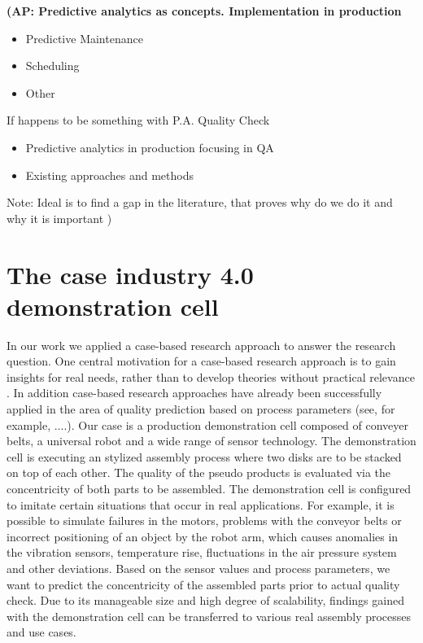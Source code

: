 \documentclass[5p,times,procedia]{elsarticle}
\newcommand{\AP}[1]{{\color{blue} {\bf (AP: #1)}}}
\begin{document}
\AP{
Predictive analytics as concepts. Implementation in production
\begin{itemize}
       \item Predictive Maintenance
       \item Scheduling
       \item Other
\end{itemize}       
If happens to be something with P.A. Quality Check
\begin{itemize}
       \item	Predictive analytics in production focusing in QA
       \item	Existing approaches and methods
\end{itemize}      
Note: Ideal is to find a gap in the literature, that proves why do we do it and why it is important
}


\section{The case industry 4.0 demonstration cell} %

In our work we applied a case-based research approach \cite{yin2017case} to answer the research question. 
One central motivation for a case-based research approach is to gain insights for real needs, rather than to develop theories without practical relevance \cite{cutcheon1993case}. %
In addition case-based research approaches have already been successfully applied in the area of quality prediction based on process parameters (see, for example, ....). %
Our case is a production demonstration cell composed of conveyer belts, a universal robot and a wide range of sensor technology.
The demonstration cell is executing an stylized assembly process where two disks are to be stacked on top of each other. 
The quality of the pseudo products is evaluated via the concentricity of both parts to be assembled. The demonstration cell is configured to imitate certain situations that occur in real applications.
For example, it is possible to simulate failures in the motors, problems with the conveyor belts or incorrect positioning of an object by the robot arm, which causes anomalies in the vibration sensors, 
temperature rise, fluctuations in the air pressure system and other deviations. Based on the sensor values and process parameters, we want to predict the concentricity of the assembled parts prior to actual quality check. 
Due to its manageable size and high degree of scalability,
findings gained with the demonstration cell can be transferred to various real
assembly processes and use cases.
\end{document}
